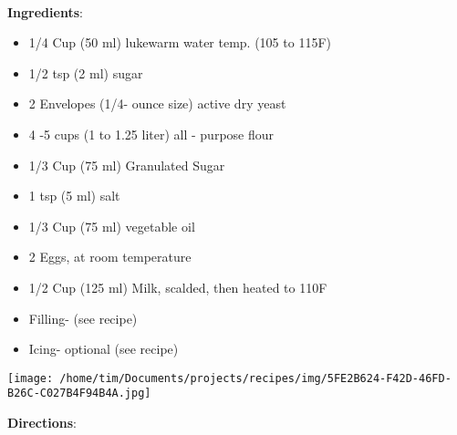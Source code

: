 \documentclass[11pt, twoside, openany]{book}
\begin{document}
 \label{t.j.-cinnamon-buns}\hfill\textit{}\\
\begin{minipage}[t]{0.8\linewidth}
\textbf{Ingredients}:\vspace{-3mm}
\begin{multicols}{2}
\begin{itemize}\setlength\itemsep{-1mm}
\item 1/4 Cup (50 ml) lukewarm water temp. (105 to 115F)
\item 1/2 tsp (2 ml) sugar
\item 2 Envelopes (1/4- ounce size) active dry yeast
\item 4 -5 cups (1 to 1.25 liter) all - purpose flour
\item 1/3 Cup (75 ml) Granulated Sugar
\item 1 tsp (5 ml) salt
\item 1/3 Cup (75 ml) vegetable oil
\item 2 Eggs, at room temperature
\item 1/2 Cup (125 ml) Milk, scalded, then heated to 110F
\item Filling- (see recipe)
\item Icing- optional (see recipe)
\end{itemize}
\end{multicols}
\end{minipage}
\begin{minipage}[t]{0.2\linewidth}
\centering \strut\vspace*{-\baselineskip}\newline
\texttt{[image: /home/tim/Documents/projects/recipes/img/5FE2B624-F42D-46FD-B26C-C027B4F94B4A.jpg]}\\
\end{minipage}\vspace{3mm}
\textbf{Directions}:
\end{document}
